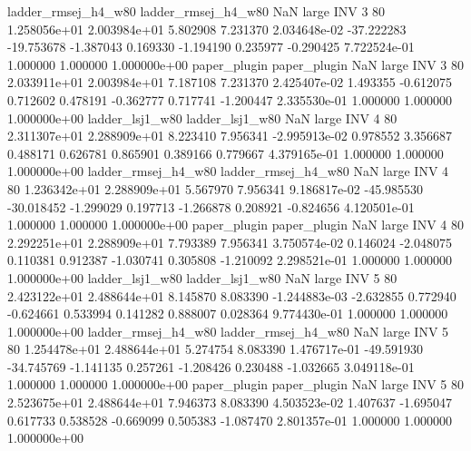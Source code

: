ladder_rmsej_h4_w80 ladder_rmsej_h4_w80                   NaN      large      INV                 3 80 1.258056e+01   2.003984e+01      5.802908       7.231370  2.034648e-02    -37.222283    -19.753678    -1.387043       0.169330 -1.194190   0.235977    -0.290425   7.722524e-01            1.000000        1.000000        1.000000e+00
       paper_plugin        paper_plugin                   NaN      large      INV                 3 80 2.033911e+01   2.003984e+01      7.187108       7.231370  2.425407e-02      1.493355     -0.612075     0.712602       0.478191 -0.362777   0.717741    -1.200447   2.335530e-01            1.000000        1.000000        1.000000e+00
    ladder_lsj1_w80     ladder_lsj1_w80                   NaN      large      INV                 4 80 2.311307e+01   2.288909e+01      8.223410       7.956341 -2.995913e-02      0.978552      3.356687     0.488171       0.626781  0.865901   0.389166     0.779667   4.379165e-01            1.000000        1.000000        1.000000e+00
ladder_rmsej_h4_w80 ladder_rmsej_h4_w80                   NaN      large      INV                 4 80 1.236342e+01   2.288909e+01      5.567970       7.956341  9.186817e-02    -45.985530    -30.018452    -1.299029       0.197713 -1.266878   0.208921    -0.824656   4.120501e-01            1.000000        1.000000        1.000000e+00
       paper_plugin        paper_plugin                   NaN      large      INV                 4 80 2.292251e+01   2.288909e+01      7.793389       7.956341  3.750574e-02      0.146024     -2.048075     0.110381       0.912387 -1.030741   0.305808    -1.210092   2.298521e-01            1.000000        1.000000        1.000000e+00
    ladder_lsj1_w80     ladder_lsj1_w80                   NaN      large      INV                 5 80 2.423122e+01   2.488644e+01      8.145870       8.083390 -1.244883e-03     -2.632855      0.772940    -0.624661       0.533994  0.141282   0.888007     0.028364   9.774430e-01            1.000000        1.000000        1.000000e+00
ladder_rmsej_h4_w80 ladder_rmsej_h4_w80                   NaN      large      INV                 5 80 1.254478e+01   2.488644e+01      5.274754       8.083390  1.476717e-01    -49.591930    -34.745769    -1.141135       0.257261 -1.208426   0.230488    -1.032665   3.049118e-01            1.000000        1.000000        1.000000e+00
       paper_plugin        paper_plugin                   NaN      large      INV                 5 80 2.523675e+01   2.488644e+01      7.946373       8.083390  4.503523e-02      1.407637     -1.695047     0.617733       0.538528 -0.669099   0.505383    -1.087470   2.801357e-01            1.000000        1.000000        1.000000e+00
